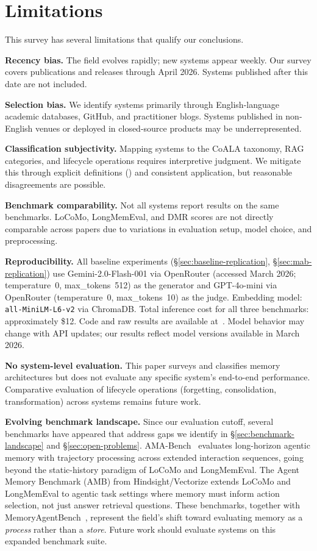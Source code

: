 \section{Limitations}
\label{sec:limitations}

This survey has several limitations that qualify our conclusions.

\textbf{Recency bias.} The field evolves rapidly; new systems appear
weekly. Our survey covers publications and releases through April
2026. Systems published after this date are not included.

\textbf{Selection bias.} We identify systems primarily through
English-language academic databases, GitHub, and practitioner blogs.
Systems published in non-English venues or deployed in closed-source
products may be underrepresented.

\textbf{Classification subjectivity.} Mapping systems to the CoALA
taxonomy, RAG categories, and lifecycle operations requires
interpretive judgment. We mitigate this through explicit definitions
() and consistent application, but reasonable
disagreements are possible.

\textbf{Benchmark comparability.} Not all systems report results on
the same benchmarks. LoCoMo, LongMemEval, and DMR scores are not
directly comparable across papers due to variations in evaluation
setup, model choice, and preprocessing.

\textbf{Reproducibility.} All baseline experiments
(\S\ref{sec:baseline-replication}, \S\ref{sec:mab-replication}) use
Gemini-2.0-Flash-001 via OpenRouter (accessed March 2026;
temperature~0, max\_tokens~512) as the generator and GPT-4o-mini via
OpenRouter (temperature~0, max\_tokens~10) as the judge.  Embedding
model: \texttt{all-MiniLM-L6-v2} via ChromaDB.  Total inference cost
for all three benchmarks: approximately \$12.  Code and raw results are
available at~\cite{alaya2026}.  Model
behavior may change with API updates; our results reflect model versions
available in March 2026.

\textbf{No system-level evaluation.} This paper surveys and classifies
memory architectures but does not evaluate any specific system's
end-to-end performance. Comparative evaluation of lifecycle operations
(forgetting, consolidation, transformation) across systems remains
future work.

\textbf{Evolving benchmark landscape.} Since our evaluation cutoff,
several benchmarks have appeared that address gaps we identify in
\S\ref{sec:benchmark-landscape} and \S\ref{sec:open-problems}.
AMA-Bench~\cite{amabench2026} evaluates long-horizon agentic memory
with trajectory processing across extended interaction sequences, going
beyond the static-history paradigm of LoCoMo and LongMemEval. The
Agent Memory Benchmark (AMB) from Hindsight/Vectorize extends
LoCoMo and LongMemEval to agentic task settings where memory must
inform action selection, not just answer retrieval questions. These
benchmarks, together with MemoryAgentBench~\cite{hu2025mab}, represent
the field's shift toward evaluating memory as a \emph{process} rather
than a \emph{store}. Future work should evaluate systems on this
expanded benchmark suite.


